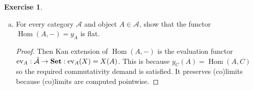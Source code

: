 \documentclass{article}
\DeclareMathOperator{\Hom}{Hom}
\newcommand{\setcat}{{\bf Set}}
\DeclareMathOperator{\ev}{ev}
\DeclareMathOperator{\elements}{Elts}
\theoremstyle{definition}
\newtheorem{question}{Exercise}
\begin{document}
\begin{question}
\begin{enumerate}[(a)]
\begin{proof}
                  Now we show the category has equalizers. Let \(l,l':a\to b\)
                  be morphisms from \(a=(f:C\to GFA,A)\) to \(b=(g:C\to GFA')\)
                  i.e. we have a commutative diagram
                  \[
                      \begin{tikzcd}[ampersand replacement=\&]
                          C\&\&GFA\\
                          \\
                          \&\&GFA'
                          \arrow["GFl"', shift right=1, from=1-3, to=3-3]
                          \arrow["GFl'", shift left=1, from=1-3, to=3-3]
                          \arrow["f", from=1-1, to=1-3]
                          \arrow["g"', from=1-1, to=3-3]
                      \end{tikzcd}
                  \]
                  by assumption this is equalized by some \((h:C\to
                  GB,B)\in\elements\mathcal{C}(C,G-)\). There is then also an
                  \(E\in\mathcal{A}\) and \(k:B\to FE\) such that
                  \((k,A)\in\elements\mathcal{B}(B,F-)\) equalizes \(l,l'\) with
                  an arrow \(n:E\to A\):
                  \[
                      \begin{tikzcd}[ampersand replacement=\&]
                          \&\&FE\\
                          \\
                          B\&\& FA\\
                          \\
                          \&\&FA'
                          \arrow["Fl"', shift right=1, from=3-3, to=5-3]
                          \arrow["Fl'", shift left=1, from=3-3, to=5-3]
                          \arrow["k", from=3-1, to=1-3]
                          \arrow["n", from=1-3, to=3-3]
                          \arrow[from=3-1, to=3-3]
                          \arrow[from=3-1, to=5-3]
                      \end{tikzcd}
                  \]
                  Therefore we have an object \((Gk\circ h:C\to GFE, E)\) such
                  that \(h\) equalizes the parallel arrows \(a,b\).
              \end{proof}

        \item For every category \(\mathcal{A}\) and object \(A\in\mathcal{A}\),
              show that the functor \(\Hom(A,-)=y_{A}\) is flat.

              \begin{proof}
                  Then Kan extension of \(\Hom(A,-)\) is the evaluation functor
                  \(\ev_{A}:\hat{\mathcal{A}}\to\setcat:\ev_{A}(X)=X(A)\). This
                  is because \(y_{C}(A)=\Hom(A,C)\) so the required
                  commutativity demand is satisfied. It preserves (co)limits
                  because (co)limits are computed pointwise.
              \end{proof}


\end{enumerate}
\end{question}
\end{document}
